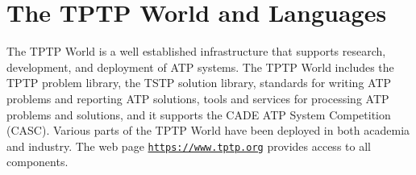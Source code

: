 \documentclass[letterpaper]{article}
\newcommand{\smalltt}[1]{\small \texttt{#1}}
\begin{document}

\section{The TPTP World and Languages}
\label{TPTP}

The TPTP World \cite{Sut17} is a well established infrastructure that supports research, 
development, and deployment of ATP systems.
The TPTP World includes the TPTP problem library,
the TSTP solution library,
standards for writing ATP problems and reporting ATP solutions,
tools and services for processing ATP problems and solutions,
and it supports the CADE ATP System Competition (CASC).
Various parts of the TPTP World have been deployed 
in both academia and industry.
The web page {\smalltt{\url{https://www.tptp.org}}} provides access to all components.
\end{document}
